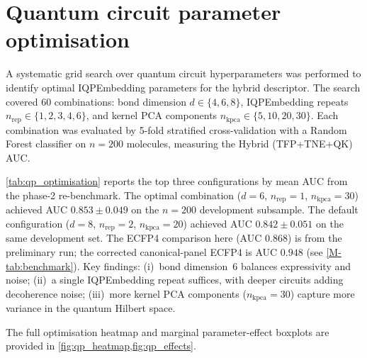 \documentclass[11pt,a4paper]{article}
\begin{document}

\section{Quantum circuit parameter optimisation}
\label{sec:qp_optimisation}

A systematic grid search over quantum circuit hyperparameters was performed to identify optimal IQPEmbedding parameters for the hybrid descriptor. The search covered 60 combinations: bond dimension $d \in \{4, 6, 8\}$, IQPEmbedding repeats $n_{\text{rep}} \in \{1, 2, 3, 4, 6\}$, and kernel PCA components $n_{\text{kpca}} \in \{5, 10, 20, 30\}$. Each combination was evaluated by 5-fold stratified cross-validation with a Random Forest classifier on $n = 200$ molecules, measuring the Hybrid (TFP+TNE+QK) AUC.

\cref{tab:qp_optimisation} reports the top three configurations by mean AUC from the phase-2 re-benchmark. The optimal combination ($d = 6$, $n_{\text{rep}} = 1$, $n_{\text{kpca}} = 30$) achieved AUC $0.853 \pm 0.049$ on the $n=200$ development subsample. The default configuration ($d = 8$, $n_{\text{rep}} = 2$, $n_{\text{kpca}} = 20$) achieved AUC $0.842 \pm 0.051$ on the same development set. The ECFP4 comparison here (AUC $0.868$) is from the preliminary run; the corrected canonical-panel ECFP4 is AUC $0.948$ (see \cref{M-tab:benchmark}). Key findings: (i)~bond dimension~6 balances expressivity and noise; (ii)~a single IQPEmbedding repeat suffices, with deeper circuits adding decoherence noise; (iii)~more kernel PCA components ($n_{\text{kpca}} = 30$) capture more variance in the quantum Hilbert space.

The full optimisation heatmap and marginal parameter-effect boxplots are provided in \cref{fig:qp_heatmap,fig:qp_effects}.
\end{document}

